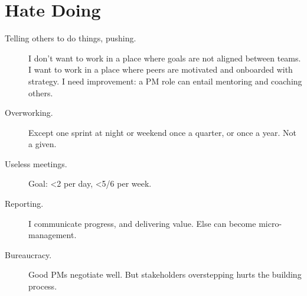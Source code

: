 \section*{Hate Doing}

\begin{description}
 \item[Telling others to do things, pushing.]
I don't want to work in a place where goals are not aligned between teams. %
I want to work in a place where peers are motivated and onboarded with
strategy.
I need improvement: a PM role can entail
mentoring and coaching others. %
 \item[Overworking.] Except one sprint at night or weekend once a quarter, or once a year.
 Not a given.
 \item[Useless meetings.] Goal: <2 per day,  <5/6 per week. %
 \item[Reporting.]
 I communicate progress, %
 and delivering value. %
 Else can become micro-management.
  \item[Bureaucracy.] Good PMs negotiate well.
  But stakeholders overstepping hurts the building process.
\end{description}


